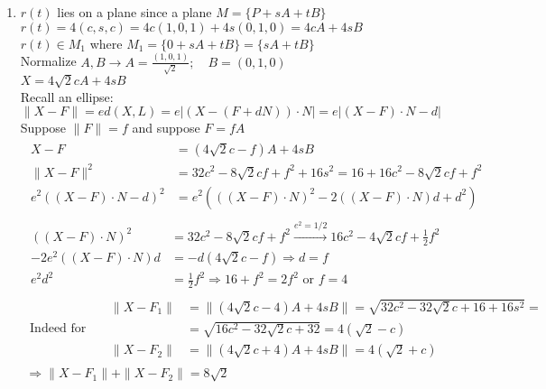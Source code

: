 \documentclass[twoside]{amsart}
\theoremstyle{plain}
\theoremstyle{definition}
\newcommand{\exercisehead}[1]
  {\smallskip
   \noindent{\small\bf Exercise #1.}}
\begin{document}
\exercisehead{4} 
\begin{enumerate}
\item $r(t)$ lies on a plane since a plane $M = \{ P + sA + tB \}$ \\
$r(t) = 4(c,s,c) = 4c(1,0,1) + 4s(0,1,0) = 4cA + 4sB$ \\
  $r(t) \in M_1$ where $M_1 = \{ 0 + sA + tB \} = \{ sA + tB \}$ \\

Normalize $A,B \to A = \frac{ (1,0,1)}{\sqrt{2} }; \quad B = (0,1,0) $ \\
$X = 4 \sqrt{2} cA + 4sB$ \\

Recall an ellipse: $\| X - F \| = ed(X,L) = e | (X - (F + dN) )\cdot N | = e| (X-F)\cdot N - d |$\\
Suppose $ \| F \| = f$ and suppose $F = fA$ 
\[
\begin{gathered}
  \begin{aligned}
    X-F & = (4\sqrt{2} c -f)A + 4sB \\
    \| X- F \|^2 & = 32 c^2 -8\sqrt{2} cf + f^2 + 16s^2 = 16 + 16 c^2 - 8\sqrt{2} cf + f^2 \\
    e^2 ((X-F)\cdot N -d)^2 & = e^2 (((X-F)\cdot N)^2 - 2((X-F)\cdot N )d + d^2) 
  \end{aligned}\\
  \begin{aligned}
    ((X-F)\cdot N)^2 & = 32 c^2 - 8\sqrt{2} cf + f^2 \xrightarrow{ e^2 = 1/2} 16c^2 - 4\sqrt{2} cf + \frac{1}{2} f^2 \\
    -2e^2 ((X-F)\cdot N)d & = -d (4\sqrt{2} c - f) \Longrightarrow d=f \\
    e^2 d^2 & = \frac{1}{2} f^2 \Longrightarrow 16 + f^2 = 2f^2 \text{ or } f=4 
  \end{aligned} 
\end{gathered}
\]
\[
\begin{gathered}
\text{ Indeed for }  \quad \, \begin{aligned}
  \| X - F_1 \| & = \| (4\sqrt{2} c - 4) A + 4sB \| = \sqrt{ 32c^2 - 32\sqrt{2} c + 16 + 16s^2 } = \\
  & = \sqrt{ 16c^2 - 32\sqrt{2} c + 32 } = 4(\sqrt{2} - c) \\
  \| X - F_2 \| & = \| (4\sqrt{2} c + 4 ) A + 4sB \| = 4 (\sqrt{2} +c ) 
  \end{aligned} \\
\Longrightarrow \| X - F_1 \| + \| X - F_2 \| = 8 \sqrt{2} 
\end{gathered}
\]

\end{enumerate}
\end{document}
